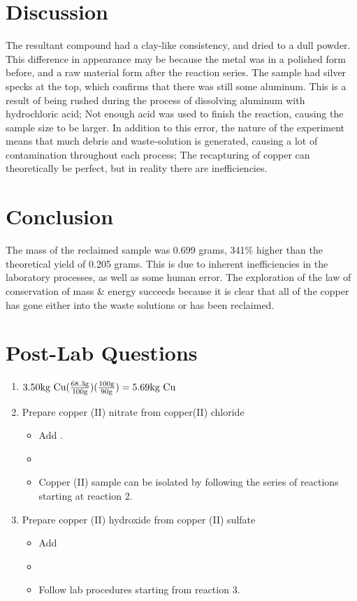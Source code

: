 \documentclass[11pt,letterpaper]{report}
\begin{document}
\section*{Discussion}
The resultant compound had a clay-like consistency, and dried to a dull powder. This difference in appearance may be because the metal was in a polished form before, and a raw material form after the reaction series. The sample had silver specks at the top, which confirms that there was still some aluminum. This is a result of being rushed during the process of dissolving aluminum with hydrochloric acid; Not enough acid was used to finish the reaction, causing the sample size to be larger. In addition to this error, the nature of the experiment means that much debris and waste-solution is generated, causing a lot of contamination throughout each process; The recapturing of copper can theoretically be perfect, but in reality there are inefficiencies. 

\section*{Conclusion}
The mass of the reclaimed sample was 0.699 grams, 341\% higher than the theoretical yield of 0.205 grams. This is due to inherent inefficiencies in the laboratory processes, as well as some human error. The exploration of the law of conservation of mass \& energy succeeds because it is clear that all of the copper has gone either into the waste solutions or has been reclaimed.

\section*{Post-Lab Questions}
\begin{enumerate}
\item $3.50 \text{kg \ce{Cu}} (\frac{68.3 \text{g}}{100 \text{g}}) (\frac{100 \text{g}}{90 \text{g}})  = 5.69 \text{kg \ce{Cu}}$
\item Prepare copper (II) nitrate from copper(II) chloride
\begin{itemize}
\item Add .
\item {}
\item Copper (II) sample can be isolated by following the series of reactions starting at reaction 2.
\end{itemize}
\item Prepare copper (II) hydroxide from copper (II) sulfate
\begin{itemize}
\item Add 
\item {}
\item Follow lab procedures starting from reaction 3.
\end{itemize}
\end{enumerate}
\end{document}
